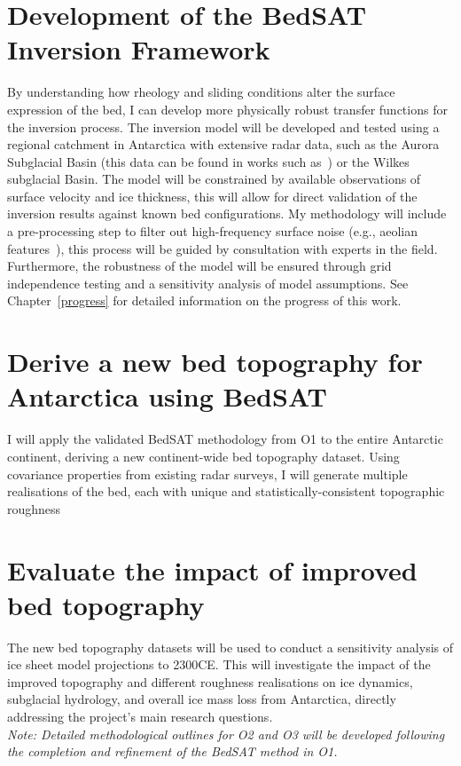 \section{Development of the BedSAT Inversion Framework}
By understanding how rheology and sliding conditions alter the surface expression of the bed, I can develop more physically robust transfer functions for the inversion process. The inversion model will be developed and tested using a regional catchment in Antarctica with extensive radar data, such as the Aurora Subglacial Basin (this data can be found in works such as~\cite{Young_2011}) or the Wilkes subglacial Basin. The model will be constrained by available observations of surface velocity and ice thickness, this will allow for direct validation of the inversion results against known bed configurations. My methodology will include a pre-processing step to filter out high-frequency surface noise (e.g., aeolian features~\cite{Poizat_2024}), this process will be guided by consultation with experts in the field. Furthermore, the robustness of the model will be ensured through grid independence testing and a sensitivity analysis of model assumptions.%
See Chapter~\ref{progress} for detailed information on the progress of this work.

\section{Derive a new bed topography for Antarctica using BedSAT}
I will apply the validated BedSAT methodology from O1 to the entire Antarctic continent, deriving a new continent-wide bed topography dataset. Using covariance properties from existing radar surveys, I will generate multiple realisations of the bed, each with unique and statistically-consistent topographic roughness%

\section{Evaluate the impact of improved bed topography}
The new bed topography datasets will be used to conduct a sensitivity analysis of ice sheet model projections to 2300CE. This will investigate the impact of the improved topography and different roughness realisations on ice dynamics, subglacial hydrology, and overall ice mass loss from Antarctica, directly addressing the project's main research questions.
\\
\textit{Note: Detailed methodological outlines for O2 and O3 will be developed following the completion and refinement of the BedSAT method in O1.}

